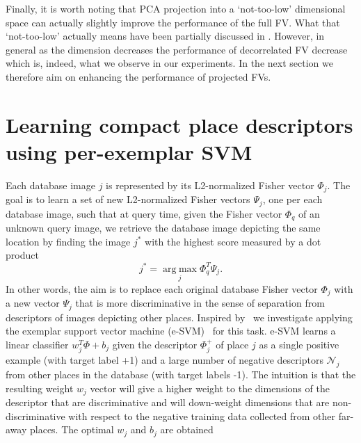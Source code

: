 \documentclass[table]{article} %
\begin{document}
			Finally, it is worth noting that PCA projection into a `not-too-low' dimensional space can actually slightly improve the performance of the full FV. What that `not-too-low' actually means have been partially discussed in \cite{Jegou2012HAL}. However, in general as the dimension decreases the performance of decorrelated FV decrease which is, indeed, what we observe in our experiments. In the next section we therefore aim on enhancing the performance of projected FVs.   


\section{Learning compact place descriptors using per-exemplar SVM}
\label{sec:perExemplar}
	Each database image $j$ is represented by its L2-normalized Fisher vector $\Phi_j$. The goal is to learn a set of new L2-normalized Fisher vectors $\Psi_j$, one per each database image, such that at query time, given the Fisher vector $\Phi_q$ of an unknown query image, we retrieve the database image depicting the same location by finding the image $j^*$ with the highest score measured by a dot product
	\begin{equation}
	    j^*=\operatorname*{arg\;max}_{j} \Phi_q^T \Psi_j. 
	    \label{eq:class}
	\end{equation}
	In other words, the aim is to replace each original database Fisher vector $\Phi_j$ with a new vector $\Psi_j$ that is more discriminative in the sense of separation from descriptors of images depicting other places. 
	Inspired by~\cite{Gronat2013} we investigate applying the exemplar support vector machine (e-SVM)~\cite{} for this task. 
	e-SVM learns a linear classifier $w_j^T\Phi+b_j$ given the descriptor $\Phi_j^+$ of place $j$ as a single positive example (with target label +1) and a large number of negative descriptors $\mathcal N_j$ from other places in the database (with target labels -1).
	The intuition is that the resulting weight $w_j$ vector will give a higher weight to the dimensions of the descriptor that are discriminative and will down-weight dimensions that are non-discriminative with respect to the negative training data collected from other far-away places.  The optimal $w_j$ and $b_j$ are obtained
\end{document}
